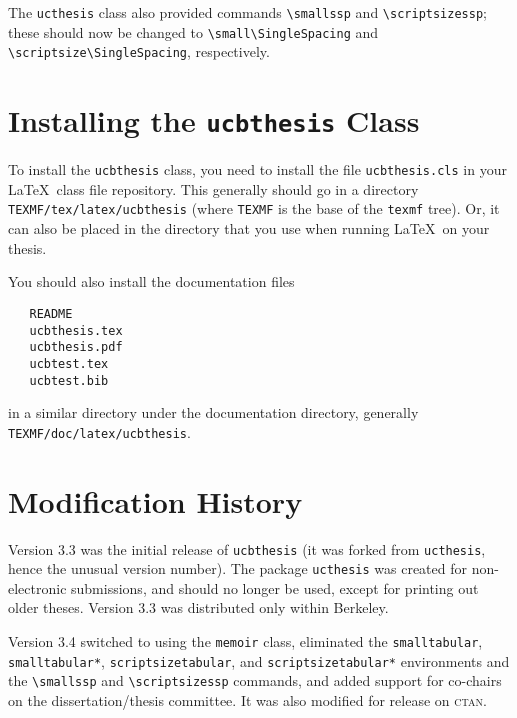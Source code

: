 \documentclass[11pt]{article}
\newcommand*{\pkg}[1]{\texttt{#1}}
\begin{document}
The \pkg{ucthesis} class also provided commands \verb!\smallssp! and\break
\verb!\scriptsizessp!; these should now be changed to
\verb!\small\SingleSpacing! and \verb!\scriptsize\SingleSpacing!,
respectively.

\section{Installing the \pkg{ucbthesis} Class}

To install the \pkg{ucbthesis} class, you need to install the file
\texttt{ucbthesis.cls} in your \LaTeX\ class file repository.  This
generally should go in a directory \lstinline!TEXMF/tex/latex/ucbthesis!
(where \lstinline!TEXMF!  is the base of the \texttt{texmf} tree).
Or, it can also be placed in the directory that you use when running
\LaTeX\ on your thesis.

You should also install the documentation files
\begin{verbatim}
   README
   ucbthesis.tex
   ucbthesis.pdf
   ucbtest.tex
   ucbtest.bib
\end{verbatim}
in a similar directory under the documentation directory, generally
\lstinline!TEXMF/doc/latex/ucbthesis!.

\section{Modification History}

Version 3.3 was the initial release of \pkg{ucbthesis} (it was forked from
\pkg{ucthesis}, hence the unusual version number).  The package \pkg{ucthesis}
was created for non-electronic submissions, and should no longer be used,
except for printing out older theses.  Version 3.3 was distributed only within
Berkeley.

Version 3.4 switched to using the \pkg{memoir} class, eliminated the
\texttt{smalltabular}, \texttt{smalltabular*}, \texttt{scriptsizetabular},
and \texttt{scriptsizetabular*} environments and the \lstinline!\smallssp!
and \lstinline!\scriptsizessp! commands, and added support for co-chairs
on the dissertation/thesis committee.  It was also modified for release
on \textsc{ctan}.
\end{document}
